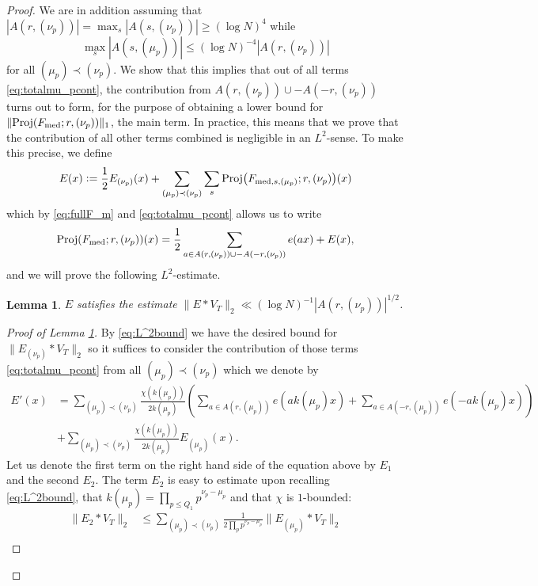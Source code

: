 \documentclass[11pt, reqno]{amsart}
\newtheorem{lemma}[theorem]{Lemma}
\DeclareMathOperator{\Proj}{Proj}
\begin{document}
\begin{proof}
We are in addition assuming that $|A(r,(\nu_p))|=\max_s|A(s,(\nu_p))|\geqslant (\log N)^4$ while
\begin{equation}\label{eq:otherAsmall}\max_s|A(s,(\mu_p))|\leqslant (\log N)^{-4}|A(r,(\nu_p))|
\end{equation}
for all $(\mu_p)\prec (\nu_p)$. We show that this implies that out of all terms \eqref{eq:totalmu_pcont}, the contribution from $A(r,(\nu_p))\cup -A(-r,(\nu_p))$ turns out to form, for the purpose of obtaining a lower bound for $\lVert \Proj(F_\textnormal{med};r,(\nu_p))\rVert_1$, the main term. In practice, this means that we prove that the contribution of all other terms combined is negligible in an $L^2$-sense. To make this precise, we define
$$E(x)\vcentcolon= \frac{1}{2}E_{(\nu_p)}(x) + \sum_{(\mu_p)\prec(\nu_p)} \sum_{s}\Proj\bigl(F_{\textnormal{med},s,(\mu_p)};r,(\nu_p)\bigr)(x)$$
which by \eqref{eq:fullF_m} and \eqref{eq:totalmu_pcont} allows us to write
\begin{align}\label{eq:projwithE}
    \Proj(F_\textnormal{med};r,(\nu_p))(x)=\frac{1}{2}\sum_{a\in A(r,(\nu_p))\cup-A(-r,(\nu_p))}e(ax) + E(x),
\end{align} and we will prove the following $L^2$-estimate.
\begin{lemma}\label{lem:L^2eror}
    $E$ satisfies the estimate $\lVert E*V_{T}\rVert_2 \ll(\log N)^{-1}|A(r,(\nu_p))|^{1/2}$.
\end{lemma}
\begin{proof}[Proof of Lemma \ref{lem:L^2eror}]
   By \eqref{eq:L^2bound} we have the desired bound for $\lVert E_{(\nu_p)}*V_T\rVert_2$ so it suffices to consider the contribution of those terms \eqref{eq:totalmu_pcont} from all $(\mu_p)\prec(\nu_p)$ which we denote by \begin{align*}
   E'(x)&=\sum_{(\mu_p)\prec(\nu_p)}\frac{\chi(k(\mu_p))}{2k(\mu_p)}\left(\sum_{a\in A(r,(\mu_p))}e(ak(\mu_p)x)+\sum_{a\in A(-r,(\mu_p))}e(-ak(\mu_p)x)\right)\\
   &+\sum_{(\mu_p)\prec(\nu_p)}\frac{\chi(k(\mu_p))}{2k(\mu_p)}E_{(\mu_p)}(x).
   \end{align*}
   Let us denote the first term on the right hand side of the equation above by $E_1$ and the second $E_2$. The term $E_2$ is easy to estimate upon recalling \eqref{eq:L^2bound}, that $k(\mu_p)=\prod_{p\leqslant Q_1}p^{\nu_p-\mu_p}$ and that $\chi$ is $1$-bounded:
   \begin{align*}
       \lVert E_2*V_{T}\rVert_2&\leqslant \sum_{(\mu_p)\prec(\nu_p)}\frac{1}{2\prod_pp^{\nu_p-\mu_p}}\lVert E_{(\mu_p)}*V_{T}\rVert_2\\

\end{align*}
\end{proof}
\end{proof}
\end{document}
